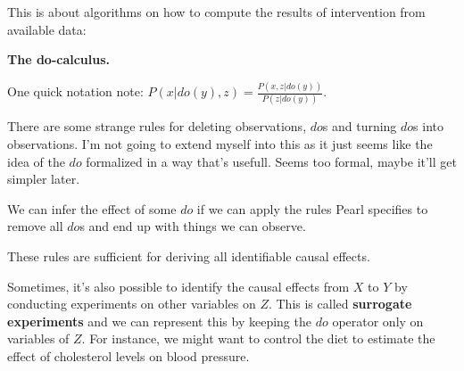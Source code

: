 This is about algorithms on how to compute the results of intervention from available data:

\textbf{The do-calculus.}

One quick notation note: $P(x|do(y),z) = \frac{P(x,z|do(y))}{P(z|do(y))}$.

There are some strange rules for deleting observations, $do$s and turning $do$s into observations. I'm not going to extend myself into this as it just seems like the idea of the $do$ formalized in a way that's usefull. Seems too formal, maybe it'll get simpler later.

We can infer the effect of some $do$ if we can apply the rules Pearl specifies to remove all $do$s and end up with things we can observe.

These rules are sufficient for deriving all identifiable causal effects.

Sometimes, it's also possible to identify the causal effects from $X$ to $Y$ by conducting experiments on other variables on $Z$. This is called \textbf{surrogate experiments} and we can represent this by keeping the $do$ operator only on variables of $Z$. For instance, we might want to control the diet to estimate the effect of cholesterol levels on blood pressure.


